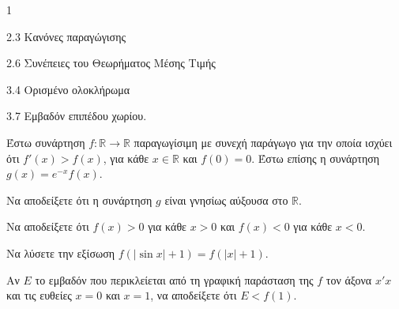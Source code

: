 \begin{ylh}{1}
    \item 2.3 Κανόνες παραγώγισης
    \item 2.6 Συνέπειες του Θεωρήματος Μέσης Τιμής
    \item 3.4 Ορισμένο ολοκλήρωμα
    \item 3.7 Εμβαδόν επιπέδου χωρίου.
\end{ylh}
Έστω συνάρτηση $f : \mathbb{R} \to \mathbb{R}$ παραγωγίσιμη με συνεχή παράγωγο για την οποία ισχύει ότι $f'(x) > f(x)$, για κάθε $x \in \mathbb{R}$ και $f(0)=0$. Έστω επίσης η συνάρτηση $g(x)=e^{-x} f(x)$.

\begin{alist}
\item Να αποδείξετε ότι η συνάρτηση $g$ είναι γνησίως αύξουσα στο $\mathbb{R}$. 
\item Να αποδείξετε ότι $f(x) > 0$ για κάθε $x > 0$ και $f(x) < 0$ για κάθε $x < 0$. 
\item Να λύσετε την εξίσωση $f(|\sin x|+1) = f(|x|+1)$. 
\item Αν $E$ το εμβαδόν που περικλείεται από τη γραφική παράσταση της $f$ τον άξονα $x'x$ και τις ευθείες $x=0$ και $x=1$, να αποδείξετε ότι $E < f(1)$. 
\end{alist}